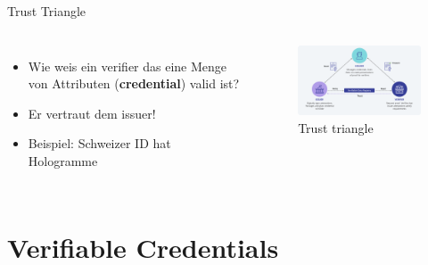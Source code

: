 \documentclass[
	german,%
	authorontitle=true,
	]{bfhbeamer}
\begin{document}
\begin{frame}{Trust Triangle}
    \begin{columns}[onlytextwidth,T]
        \column{70mm}  
        \begin{itemize}
            \item Wie weis ein verifier das eine Menge von Attributen (\textbf{credential}) valid ist?
            \item Er vertraut dem issuer!
            \item Beispiel: Schweizer ID hat Hologramme
        \end{itemize}

        \column{70mm}

        \begin{figure}
            \centering
            \includegraphics[width=70mm]{../img/trusttriangle.png}
            \caption{Trust triangle}
        \end{figure}
        
    \end{columns}
\end{frame}

\section{Verifiable Credentials}
\end{document}
